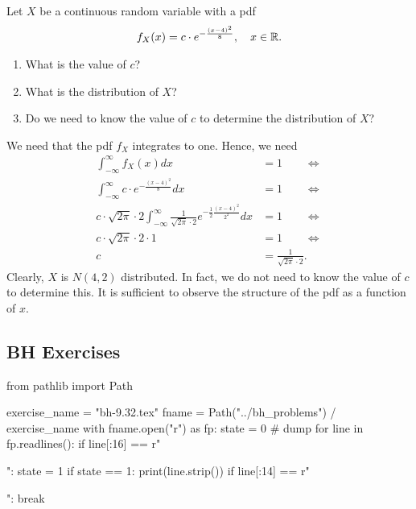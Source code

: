 \begin{exercise}
Let $X$ be a continuous random variable with a pdf
\begin{align}
    f_X(x) = c \cdot e^{-\frac{(x - 4)^2}{8}}, \quad x \in \mathbb{R}.
\end{align}
\begin{enumerate}
    \item What is the value of $c$?
    \item What is the distribution of $X$?
    \item Do we need to know the value of $c$ to determine the distribution of $X$?
\end{enumerate}
\begin{solution}
We need that the pdf $f_X$ integrates to one. Hence, we need
\begin{align}
    \int_{-\infty}^\infty f_X(x) dx &= 1 \qquad \iff \\
    \int_{-\infty}^\infty c \cdot e^{-\frac{(x - 4)^2}{8}} dx &= 1 \qquad \iff \\
    c \cdot \sqrt{2\pi}\cdot 2 \int_{-\infty}^\infty  \frac{1}{\sqrt{2\pi}\cdot 2} e^{-\frac{1}{2}\frac{(x - 4)^2}{2^2}} dx &= 1 \qquad \iff \\
    c \cdot \sqrt{2\pi}\cdot 2 \cdot 1 &= 1 \qquad \iff \\
    c &= \frac{1}{\sqrt{2\pi}\cdot 2}.
\end{align}
Clearly, $X$ is $N(4,2)$ distributed. In fact, we do not need to know the value of $c$ to determine this. It is sufficient to observe the structure of the pdf as a function of $x$.
\end{solution}
\end{exercise}


\subsection{BH Exercises}


\begin{pycode}
from pathlib import Path

exercise_name = "bh-9.32.tex"
fname = Path("../bh_problems") / exercise_name
with fname.open("r") as fp:
    state = 0  # dump
    for line in fp.readlines():
        if line[:16] == r"\begin{exercise}":
            state = 1
        if state == 1:
            print(line.strip())
        if line[:14] == r"\end{exercise}":
            break
\end{pycode}

